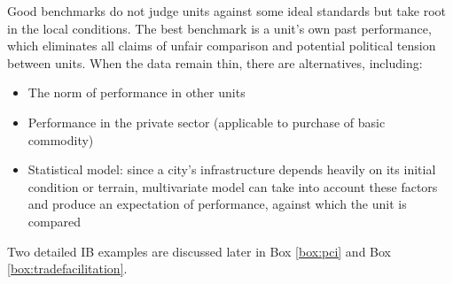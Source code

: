 \documentclass[12pt]{article}
\begin{document}
Good benchmarks do not judge units against some ideal standards but take root in the local conditions. The best benchmark is a unit's own past performance, which eliminates all claims of unfair comparison and potential political tension between units. When the data remain thin, there are alternatives, including:
\begin{itemize}[noitemsep]
\item{The norm of performance in other units}
\item{Performance in the private sector (applicable to purchase of basic commodity)}
\item{Statistical model: since a city's infrastructure depends heavily on its initial condition or terrain, multivariate model can take into account these factors and produce an expectation of performance, against which the unit is compared}
\end{itemize}

Two detailed IB examples are discussed later in Box \ref{box:pci} and Box \ref{box:tradefacilitation}.
\end{document}
